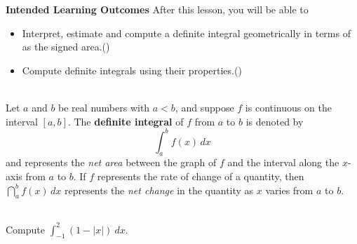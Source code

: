 \documentclass[10pt]{article}
\begin{document}
\pagestyle{otherpages}
\thispagestyle{firstpage}

\textbf{Intended Learning Outcomes}
After this lesson, you will be able to 

\begin{itemize}
    \item Interpret, estimate and compute a definite integral geometrically in terms of as the signed area.()
    \item Compute definite integrals using their properties.()
\end{itemize}

\vspace{-0.6cm}

\hrulefill\\

\vspace{-0.6cm}
{
Let $a$ and $b$ be real numbers with $a<b$, and suppose $f$ is continuous on the interval $[a,b]$. The {\bf definite integral} of $f$ from $a$ to $b$ is denoted by \[\int_a^b f(x)\,dx\] and represents the {\it net area} between the graph of $f$ and the interval along the $x$-axis from $a$ to $b$. If $f$ represents the rate of change of a quantity, then $\dint_a^b f(x)\,dx$ represents the {\it net change} in the quantity as $x$ varies from $a$ to $b$.
}


\\
{\example}  Compute $\displaystyle\int_{-1}^2 (1-|x|)\ dx$.
\end{document}
